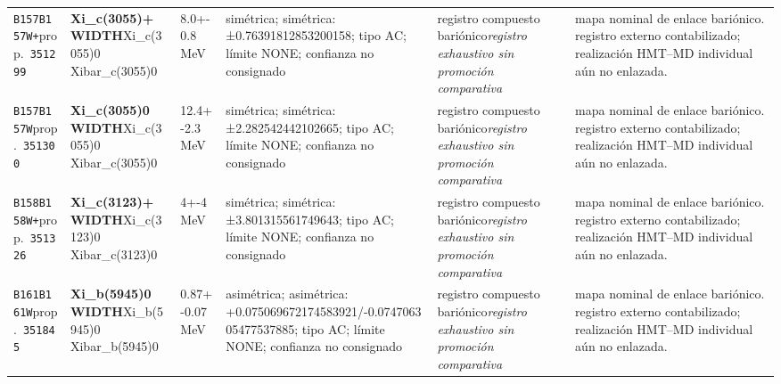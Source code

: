 \begin{landscape}
\begin{longtable}{L{1.85cm}L{4.45cm}L{2.35cm}L{4.05cm}L{3.35cm}L{7.15cm}}
\texttt{B157}\newline \texttt{B157W+}\newline prop.\ \texttt{351299} & \textbf{Xi\_\allowbreak{}c(3055)+ WIDTH}\newline Xi\_\allowbreak{}c(3055)0 \textbar{}\allowbreak{} Xibar\_\allowbreak{}c(3055)0 & 8.0+-0.8\,MeV & simétrica; simétrica: ±0.76391812853200158; tipo AC; límite NONE; confianza no consignado & registro compuesto bariónico\newline \emph{registro exhaustivo sin promoción comparativa} & mapa nominal de enlace bariónico. registro externo contabilizado; realización HMT--MD individual aún no enlazada. \\
\texttt{B157}\newline \texttt{B157W}\newline prop.\ \texttt{351300} & \textbf{Xi\_\allowbreak{}c(3055)0 WIDTH}\newline Xi\_\allowbreak{}c(3055)0 \textbar{}\allowbreak{} Xibar\_\allowbreak{}c(3055)0 & 12.4+-2.3\,MeV & simétrica; simétrica: ±2.282542442102665; tipo AC; límite NONE; confianza no consignado & registro compuesto bariónico\newline \emph{registro exhaustivo sin promoción comparativa} & mapa nominal de enlace bariónico. registro externo contabilizado; realización HMT--MD individual aún no enlazada. \\
\texttt{B158}\newline \texttt{B158W+}\newline prop.\ \texttt{351326} & \textbf{Xi\_\allowbreak{}c(3123)+ WIDTH}\newline Xi\_\allowbreak{}c(3123)0 \textbar{}\allowbreak{} Xibar\_\allowbreak{}c(3123)0 & 4+-4\,MeV & simétrica; simétrica: ±3.801315561749643; tipo AC; límite NONE; confianza no consignado & registro compuesto bariónico\newline \emph{registro exhaustivo sin promoción comparativa} & mapa nominal de enlace bariónico. registro externo contabilizado; realización HMT--MD individual aún no enlazada. \\
\texttt{B161}\newline \texttt{B161W}\newline prop.\ \texttt{351845} & \textbf{Xi\_\allowbreak{}b(5945)0 WIDTH}\newline Xi\_\allowbreak{}b(5945)0 \textbar{}\allowbreak{} Xibar\_\allowbreak{}b(5945)0 & 0.87+-0.07\,MeV & asimétrica; asimétrica: +0.075069672174583921/-0.074706305477537885; tipo AC; límite NONE; confianza no consignado & registro compuesto bariónico\newline \emph{registro exhaustivo sin promoción comparativa} & mapa nominal de enlace bariónico. registro externo contabilizado; realización HMT--MD individual aún no enlazada. \\

\end{longtable}
\end{landscape}
